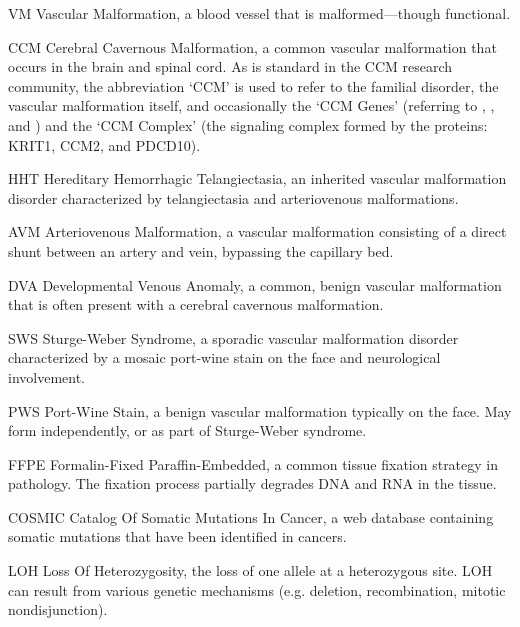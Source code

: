 \begin{symbollist}
	\item[VM] Vascular Malformation, a blood vessel that is malformed---though functional.
	
	\item[CCM] Cerebral Cavernous Malformation, a common vascular malformation that occurs in the brain and spinal cord. As is standard in the CCM research community, the abbreviation `CCM' is used to refer to the familial disorder, the vascular malformation itself, and occasionally the `CCM Genes' (referring to , , and ) and the `CCM Complex' (the signaling complex formed by the proteins: KRIT1, CCM2, and PDCD10). 
	
	\item[HHT] Hereditary Hemorrhagic Telangiectasia, an inherited vascular malformation disorder characterized by telangiectasia and arteriovenous malformations. 
	
	\item[AVM] Arteriovenous Malformation, a vascular malformation consisting of a direct shunt between an artery and vein, bypassing the capillary bed. 
	
	\item[DVA] Developmental Venous Anomaly, a common, benign vascular malformation that is often present with a cerebral cavernous malformation.
	
	\item[SWS] Sturge-Weber Syndrome, a sporadic vascular malformation disorder characterized by a mosaic port-wine stain on the face and neurological involvement. 
	
	\item[PWS] Port-Wine Stain, a benign vascular malformation typically on the face. May form independently, or as part of Sturge-Weber syndrome. 
	
	\item[FFPE] Formalin-Fixed Paraffin-Embedded, a common tissue fixation strategy in pathology. The fixation process partially degrades DNA and RNA in the tissue. 
	
	\item[COSMIC] Catalog Of Somatic Mutations In Cancer, a web database containing somatic mutations that have been identified in cancers. 
	
	\item[LOH] Loss Of Heterozygosity, the loss of one allele at a heterozygous site. LOH can result from various genetic mechanisms (e.g. deletion, recombination, mitotic nondisjunction).
	
\end{symbollist}
